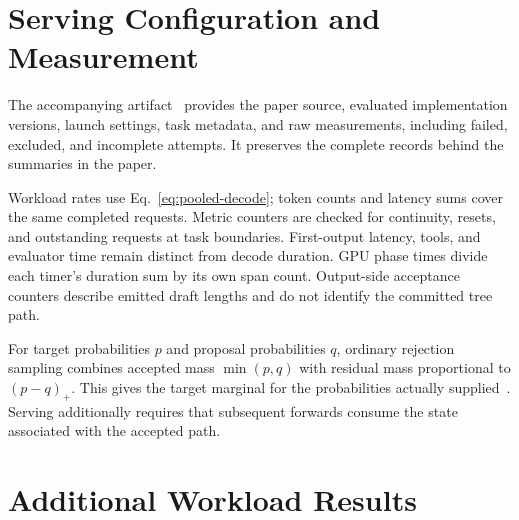 \documentclass[conference]{IEEEtran}
\begin{document}
\appendices
\section{Serving Configuration and Measurement}
\label{app:audit}
\label{app:settings}
The accompanying artifact~\cite{lumo2026archive} provides the paper source, evaluated implementation versions, launch settings, task metadata, and raw measurements, including failed, excluded, and incomplete attempts. It preserves the complete records behind the summaries in the paper.


Workload rates use Eq.~\ref{eq:pooled-decode}; token counts and latency sums cover the same completed requests. Metric counters are checked for continuity, resets, and outstanding requests at task boundaries. First-output latency, tools, and evaluator time remain distinct from decode duration. GPU phase times divide each timer's duration sum by its own span count. Output-side acceptance counters describe emitted draft lengths and do not identify the committed tree path.

For target probabilities $p$ and proposal probabilities $q$, ordinary rejection sampling combines accepted mass $\min(p,q)$ with residual mass proportional to $(p-q)_+$. This gives the target marginal for the probabilities actually supplied~\cite{leviathan2023fast,chen2023sampling}. Serving additionally requires that subsequent forwards consume the state associated with the accepted path.

\section{Additional Workload Results}
\label{app:workload}


\FloatBarrier
\label{ReferencesStart}
\IEEEtriggercmd{\balance}


\end{document}
